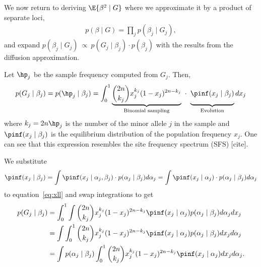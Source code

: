 We now return to deriving $\E{\beta^2 \mid G}$ where we approximate it by a product of separate loci,
\begin{align} \label{eq:mean_field}
    p(\beta \mid G) = \prod_j p(\beta_j \mid G_j),
\end{align}
and expand $p(\beta_j \mid G_j)\ \propto \ p(G_j \mid \beta_j) \cdot p(\beta_j)$ with the results from the diffusion approximation.

Let $\hp_j$ be the sample frequency computed from $G_j$. Then,
\begin{align} \label{eq:xll}
        p(G_j \mid \beta_j) 
        = p(\hp_j \mid \beta_j) 
        = \int_0^1 
        \underbrace{\binom{2n}{k_j} x_j^{k_j}(1-x_j)^{2n-k_j}}_{\text{Binomial sampling}}
        \ \cdot \ 
        \underbrace{\vphantom{\binom{1}{k_j}}\pinf(x_j \mid \beta_j)}_{\text{Evolution}} dx_j
\end{align}
where $k_j = 2n \hp_j$ is the number of the minor allele $j$ in the sample and $\pinf(x_j \mid \beta_j)$ is the equilibrium distribution of the population frequency $x_j$.
One can see that this expression resembles the site frequency spectrum (SFS) [cite].

We substitute 
\begin{align}
    \pinf(x_j \mid \beta_j) 
        =
        \int \pinf(x_j \mid \alpha_j, \beta_j) \cdot p(\alpha_j \mid \beta_j) d\alpha_j 
        = \int \pinf(x_j \mid \alpha_j) \cdot p(\alpha_j \mid \beta_j) d\alpha_j 
\end{align}
to equation~\ref{eq:xll} and swap integrations to get
\begin{align} \label{eq:swapped}
    \begin{aligned}
    p(G_j \mid \beta_j) &=
    \int_0^1 \int 
    \binom{2n}{k_j} x_j^{k_j}(1-x_j)^{2n-k_j}
    \pinf(x_j \mid \alpha_j) p(\alpha_j \mid \beta_j) d\alpha_j dx_j \\
    &= \int \int_0^1
    \binom{2n}{k_j} x_j^{k_j}(1-x_j)^{2n-k_j}
    \pinf(x_j \mid \alpha_j) p(\alpha_j \mid \beta_j) dx_j d\alpha_j  \\
    &= \int p(\alpha_j \mid \beta_j)\int_0^1
    \binom{2n}{k_j} x_j^{k_j}(1-x_j)^{2n-k_j}
    \pinf(x_j \mid \alpha_j)  dx_j d\alpha_j. 
    \end{aligned}
\end{align}

